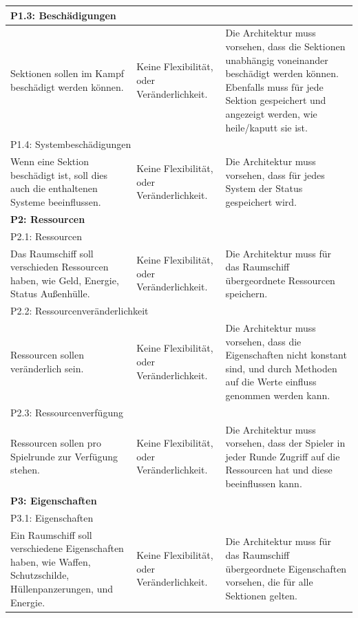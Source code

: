 \documentclass[fontsize=12pt,paper=a4,twoside]{scrartcl}
\begin{document}
\begin{longtable}[c]{|p{5cm}|p{5cm}|p{5cm}|}
\multicolumn{3}{|l|}{{P1.3: Beschädigungen}} 
\\ \hline
Sektionen sollen im Kampf beschädigt werden können.  & Keine Flexibilität, oder Veränderlichkeit.    & Die Architektur muss vorsehen, dass die Sektionen unabhängig voneinander beschädigt werden können. Ebenfalls muss für jede Sektion gespeichert und angezeigt werden, wie heile/kaputt sie ist. 
\\ \hline
\multicolumn{3}{|l|}{{P1.4: Systembeschädigungen}} 
\\ \hline
Wenn eine Sektion beschädigt ist, soll dies auch die enthaltenen Systeme beeinflussen. & Keine Flexibilität, oder Veränderlichkeit.    & Die Architektur muss vorsehen, dass für jedes System der Status gespeichert wird. 
\\ \hline
%
\multicolumn{3}{|l|}{{\textbf{P2: Ressourcen}}} 
\\ \hline
\multicolumn{3}{|l|}{{P2.1: Ressourcen}} 
\\ \hline
Das Raumschiff soll verschieden Ressourcen haben, wie Geld, Energie, Status Außenhülle.  & Keine Flexibilität, oder Veränderlichkeit.    & Die Architektur muss für das Raumschiff übergeordnete Ressourcen speichern. 
\\ \hline                                                      
\multicolumn{3}{|l|}{{P2.2: Ressourcenveränderlichkeit}} 
\\ \hline
Ressourcen sollen veränderlich sein. & Keine Flexibilität, oder Veränderlichkeit.    & Die Architektur muss vorsehen, dass die Eigenschaften nicht konstant sind, und durch Methoden auf die Werte einfluss genommen werden kann. 
\\ \hline
\multicolumn{3}{|l|}{{P2.3: Ressourcenverfügung}} 
\\ \hline
Ressourcen sollen pro Spielrunde zur Verfügung stehen. & Keine Flexibilität, oder Veränderlichkeit.    & Die Architektur muss vorsehen, dass der Spieler in jeder Runde Zugriff auf die Ressourcen hat und diese beeinflussen kann. 
\\ \hline
%
\multicolumn{3}{|l|}{{\textbf{P3: Eigenschaften}}} 
\\ \hline
\multicolumn{3}{|l|}{{P3.1: Eigenschaften}} 
\\ \hline
Ein Raumschiff soll verschiedene Eigenschaften haben, wie Waffen, Schutzschilde, Hüllenpanzerungen, und Energie. & Keine Flexibilität, oder Veränderlichkeit.    &  Die Architektur muss für das Raumschiff übergeordnete Eigenschaften vorsehen, die für alle Sektionen gelten. 
\\ \hline

\end{longtable}
\end{document}
